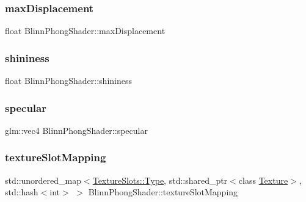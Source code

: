 \hypertarget{class_blinn_phong_shader_a9e5e58c4901d48b315e94d15fd504a8c}{}\label{class_blinn_phong_shader_a9e5e58c4901d48b315e94d15fd504a8c} 
\subsubsection{\texorpdfstring{max\+Displacement}{maxDisplacement}}
{\footnotesize\ttfamily float Blinn\+Phong\+Shader\+::max\+Displacement\hspace{0.3cm}{\ttfamily [private]}}

\hypertarget{class_blinn_phong_shader_ad499c2389d7007ecb4c03d5270314933}{}\label{class_blinn_phong_shader_ad499c2389d7007ecb4c03d5270314933} 
\subsubsection{\texorpdfstring{shininess}{shininess}}
{\footnotesize\ttfamily float Blinn\+Phong\+Shader\+::shininess\hspace{0.3cm}{\ttfamily [protected]}}

\hypertarget{class_blinn_phong_shader_a7adce7364e850b9f232e058956f809b8}{}\label{class_blinn_phong_shader_a7adce7364e850b9f232e058956f809b8} 
\subsubsection{\texorpdfstring{specular}{specular}}
{\footnotesize\ttfamily glm\+::vec4 Blinn\+Phong\+Shader\+::specular\hspace{0.3cm}{\ttfamily [protected]}}

\hypertarget{class_blinn_phong_shader_a7467b1de2650fd04ea63ed5f8aeedc59}{}\label{class_blinn_phong_shader_a7467b1de2650fd04ea63ed5f8aeedc59} 
\subsubsection{\texorpdfstring{texture\+Slot\+Mapping}{textureSlotMapping}}
{\footnotesize\ttfamily std\+::unordered\+\_\+map$<$\hyperlink{struct_blinn_phong_shader_1_1_texture_slots_a98940b49ba855ee47d61a6243c05c34d}{Texture\+Slots\+::\+Type}, std\+::shared\+\_\+ptr$<$class \hyperlink{class_texture}{Texture}$>$, std\+::hash$<$int$>$ $>$ Blinn\+Phong\+Shader\+::texture\+Slot\+Mapping\hspace{0.3cm}{\ttfamily [private]}}



